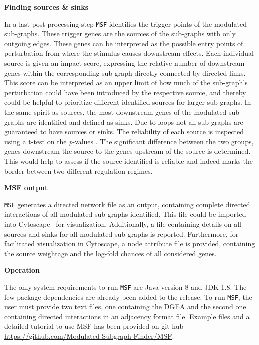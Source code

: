 \documentclass[10pt,a4paper,twocolumn]{article}
\begin{document}
	\textbf{Finding sources \& sinks}
	
	In a last post processing step \texttt{MSF} identifies the
        trigger points of the modulated sub-graphs. These trigger
        genes are the sources of the sub-graphs with only outgoing
        edges. These genes can be interpreted as the possible entry
        points of perturbation from where the stimulus causes
        downstream effects. Each individual source is given an impact
        score, expressing the relative number of downstream genes
        within the corresponding sub-graph directly connected by
        directed links. This score can be interpreted as an upper
        limit of how much of the sub-graph's perturbation could have
        been introduced by the respective source, and thereby could be
        helpful to prioritize different identified sources for larger
        sub-graphs. In the same spirit as sources, the most downstream
        genes of the modulated sub-graphs are identified and defined
        as sinks. Due to loops not all sub-graphs are guaranteed to
        have sources or sinks. The reliability of each source is
        inspected using a t-test on the \textit{p}-values . The
        significant difference between the two groups, genes
        downstream the source to the genes upstream of the source is
        determined. This would help to assess if the source identified
        is reliable and indeed marks the border between two different
        regulation regimes.
	
	
	\textbf{MSF output}
	
	\texttt{MSF} generates a directed network file as an output,
        containing complete directed interactions of all modulated
        sub-graphs identified. This file could be imported into
        Cytoscape~\cite{Cyto} for visualization. Additionally, a file
        containing details on all sources and sinks for all modulated
        sub-graphs is reported. Furthermore, for facilitated
        visualization in Cytoscape, a node attribute file is provided,
        containing the source weightage and the log-fold chances of
        all considered genes.
	
	\textbf{Operation}
	
	The only system requirements to run \texttt{MSF} are Java version 8 and JDK 1.8. The few package
		dependencies are already been added to the release. To run
		\texttt{MSF}, the user must provide two text files, one containing the
		DGEA and the second one containing
        directed interactions in an adjacency format file. Example
        files and a detailed tutorial to use MSF has been provided on
        git hub \url{https://github.com/Modulated-Subgraph-Finder/MSF}.
	
\end{document}
